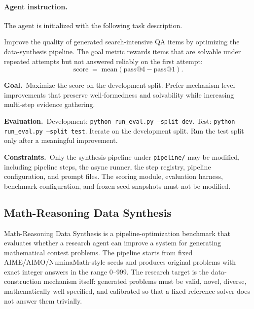 \paragraph{Agent instruction.}
The agent is initialized with the following task description.

\begin{promptbox}[title=\textbf{Search-Agent Data Synthesis Task Instruction}]
Improve the quality of generated search-intensive QA items by optimizing
the data-synthesis pipeline.
The goal metric rewards items that are solvable under repeated attempts but
not answered reliably on the first attempt:
\[
\mathrm{score}
\;=\;
\mathrm{mean}(\mathrm{pass@4} - \mathrm{pass@1}).
\]

\smallskip
\noindent\textbf{Goal.}~Maximize the score on the development split.
Prefer mechanism-level improvements that preserve well-formedness and
solvability while increasing multi-step evidence gathering.

\smallskip
\noindent\textbf{Evaluation.}~Development: \texttt{python run\_eval.py --split dev}.
Test: \texttt{python run\_eval.py --split test}.
Iterate on the development split. Run the test split only after a
meaningful improvement.

\smallskip
\noindent\textbf{Constraints.}~Only the synthesis pipeline under
\texttt{pipeline/} may be modified, including pipeline steps, the async
runner, the step registry, pipeline configuration, and prompt files.
The scoring module, evaluation harness, benchmark configuration, and
frozen seed snapshots must not be modified.
\end{promptbox}

\subsection{Math-Reasoning Data Synthesis}
\label{app:benchmark-math-reasoning-data}
\label{app:math-case-study}

Math-Reasoning Data Synthesis is a pipeline-optimization benchmark that
evaluates whether a research agent can improve a system for generating
mathematical contest problems.
The pipeline starts from fixed AIME/AIMO/NuminaMath-style seeds and produces
original problems with exact integer answers in the range 0--999.
The research target is the data-construction mechanism itself: generated
problems must be valid, novel, diverse, mathematically well specified, and
calibrated so that a fixed reference solver does not answer them trivially.

